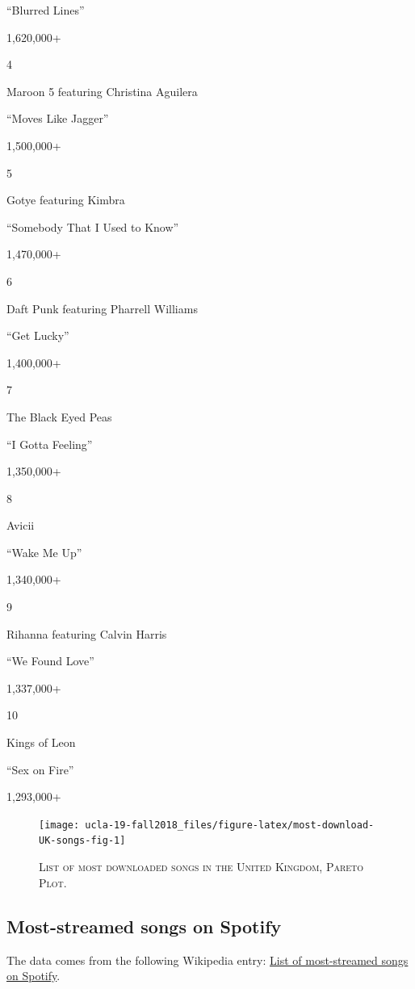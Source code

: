 \documentclass[]{book}
\theoremstyle{definition}
\theoremstyle{definition}
\theoremstyle{definition}
\theoremstyle{remark}
\begin{document}
``Blurred Lines''

1,620,000+

4

Maroon 5 featuring Christina Aguilera

``Moves Like Jagger''

1,500,000+

5

Gotye featuring Kimbra

``Somebody That I Used to Know''

1,470,000+

6

Daft Punk featuring Pharrell Williams

``Get Lucky''

1,400,000+

7

The Black Eyed Peas

``I Gotta Feeling''

1,350,000+

8

Avicii

``Wake Me Up''

1,340,000+

9

Rihanna featuring Calvin Harris

``We Found Love''

1,337,000+

10

Kings of Leon

``Sex on Fire''

1,293,000+




\begin{figure}

{\centering \texttt{[image: ucla-19-fall2018\_files/figure-latex/most-download-UK-songs-fig-1]} 

}

\caption{\textsc{List of most downloaded songs
in the United Kingdom, Pareto Plot.}}\label{fig:most-download-UK-songs-fig}
\end{figure}

\subsection{Most-streamed songs on
Spotify}\label{most-streamed-songs-on-spotify}

The data comes from the following Wikipedia entry:
\href{https://en.wikipedia.org/wiki/List_of_most-streamed_songs_on_Spotify}{List
of most-streamed songs on Spotify}.
\end{document}
